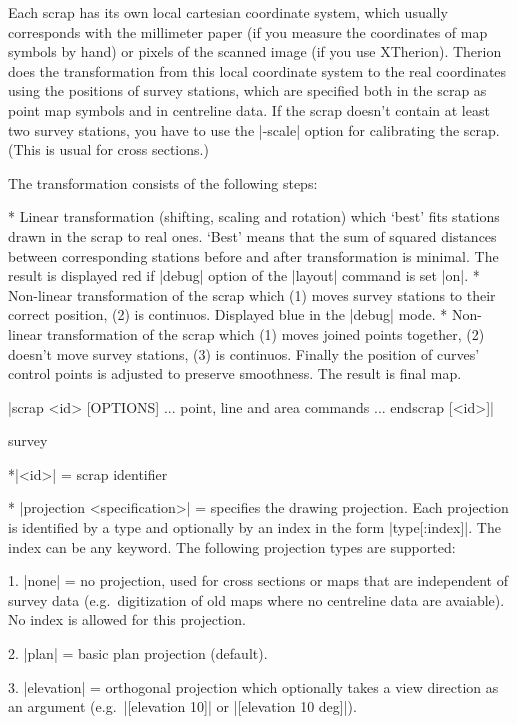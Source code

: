   Each scrap has its own local cartesian coordinate system, which usually 
  corresponds with the millimeter paper (if you measure the coordinates of map
  symbols by hand) or pixels of the scanned image (if you use XTherion).
  Therion does the transformation from this local coordinate system to the 
  real coordinates using the positions of survey stations, which are 
  specified both in the scrap as point map symbols and in centreline data.
  If the scrap doesn't contain at least two survey stations, you have
  to use the |-scale| option for calibrating the scrap. (This is usual for
  cross sections.) 
  
The transformation consists of the following steps:

\list  
* Linear transformation (shifting, scaling and rotation) which `best' fits
  stations drawn in the scrap to real ones. `Best' means that the sum of 
  squared distances between corresponding stations before and after 
  transformation is minimal. The result is displayed red if |debug| option 
  of the |layout| command is set |on|.
* Non-linear transformation of the scrap which (1) moves survey stations
  to their correct position, (2) is continuos. Displayed blue in the |debug| 
  mode.
* Non-linear transformation of the scrap which (1) moves joined points
  together, (2) doesn't move survey stations, (3) is continuos. 
  Finally the position of curves' control points is adjusted to preserve 
  smoothness. The result is final map.
\endlist

\enddescription

\syntax |scrap <id> [OPTIONS]
       ... point, line and area commands ...
       endscrap [<id>]|
\endsyntax

\context
  survey
\endcontext

\arguments
  *|<id>| = scrap identifier
\endarguments

\options
  * |projection <specification>| = specifies the drawing projection.
    Each projection is identified by a type and optionally by an index
    in the form |type[:index]|. The index can be any keyword. The following 
    projection types are supported:

    1. |none| = no projection, used for cross sections or maps that
       are independent of survey data (e.g.~digitization of old maps where 
       no centreline data are avaiable). 
       No index is allowed for this projection.

    2. |plan| = basic plan projection (default).

    3. |elevation| = orthogonal projection which optionally takes a view 
       direction as an argument (e.g.~|[elevation 10]| or |[elevation 10 deg]|).

